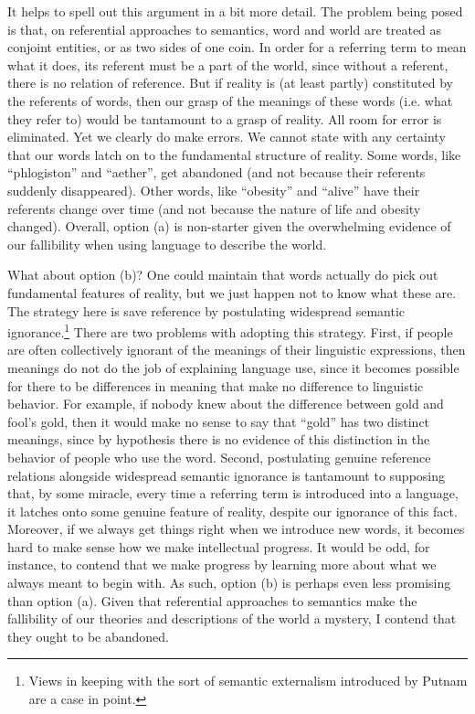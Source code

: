 It helps to spell out this argument in a bit more detail. The problem being posed is that, on referential approaches to semantics, word and world are treated as conjoint entities, or as two sides of one coin. In order for a referring term to mean what it does, its referent must be a part of the world, since without a referent, there is no relation of reference. But if reality is (at least partly) constituted by the referents of words, then our grasp of the meanings of these words (i.e. what they refer to) would be tantamount to a grasp of reality. All room for error is eliminated. Yet we clearly do make errors. We cannot state with any certainty that our words latch on to the fundamental structure of reality. Some words, like ``phlogiston'' and ``aether'', get abandoned (and not because their referents suddenly disappeared). Other words, like ``obesity'' and ``alive'' have their referents change over time (and not because the nature of life and obesity changed). Overall, option (a) is non-starter given the overwhelming evidence of our fallibility when using language to describe the world.

What about option (b)? One could maintain that words actually do pick out fundamental features of reality, but we just happen not to know what these are. The strategy here is save reference by postulating widespread semantic ignorance.\footnote{Views in keeping with the sort of semantic externalism introduced by Putnam \citeyear{Putnam:1975} are a case in point.} There are two problems with adopting this strategy. First, if people are often collectively ignorant of the meanings of their linguistic expressions, then meanings do not do the job of explaining language use, since it becomes possible for there to be differences in meaning that make no difference to linguistic behavior. For example, if nobody knew about the difference between gold and fool's gold, then it would make no sense to say that ``gold'' has two distinct meanings, since by hypothesis there is no evidence of this distinction in the behavior of people who use the word. Second, postulating genuine reference relations alongside widespread semantic ignorance is tantamount to supposing that, by some miracle, every time a referring term is introduced into a language, it latches onto some genuine feature of reality, despite our ignorance of this fact. Moreover, if we always get things right when we introduce new words, it becomes hard to make sense how we make intellectual progress. It would be odd, for instance, to contend that we make progress by learning more about what we always meant to begin with. As such, option (b) is perhaps even less promising than option (a). Given that referential approaches to semantics make the fallibility of our theories and descriptions of the world a mystery, I contend that they ought to be abandoned. 

